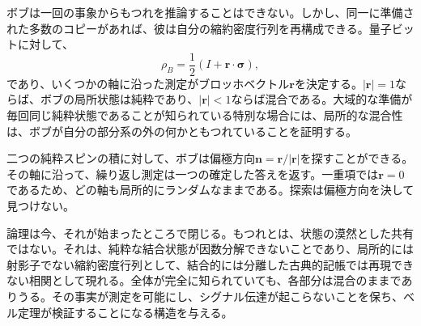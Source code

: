 ボブは一回の事象からもつれを推論することはできない。しかし、同一に準備された多数のコピーがあれば、彼は自分の縮約密度行列を再構成できる。量子ビットに対して、
\begin{equation}
\rho_B
=\frac12\left(
I+\mathbf r\cdot\boldsymbol{\sigma}
\right),
\label{eq:l7-bloch-density}
\end{equation}
であり、いくつかの軸に沿った測定がブロッホベクトル\(\mathbf r\)を決定する。\(|\mathbf r|=1\)ならば、ボブの局所状態は純粋であり、\(|\mathbf r|<1\)ならば混合である。大域的な準備が毎回同じ純粋状態であることが知られている特別な場合には、局所的な混合性は、ボブが自分の部分系の外の何かともつれていることを証明する。

二つの純粋スピンの積に対して、ボブは偏極方向\(\mathbf n=\mathbf r/|\mathbf r|\)を探すことができる。その軸に沿って、繰り返し測定は一つの確定した答えを返す。一重項では\(\mathbf r=0\)であるため、どの軸も局所的にランダムなままである。探索は偏極方向を決して見つけない。

\begin{classroomqa}
\end{classroomqa}

\begin{classroomqa}
\end{classroomqa}

論理は今、それが始まったところで閉じる。もつれとは、状態の漠然とした共有ではない。それは、純粋な結合状態が因数分解できないことであり、局所的には射影子でない縮約密度行列として、結合的には分離した古典的記帳では再現できない相関として現れる。全体が完全に知られていても、各部分は混合のままでありうる。その事実が測定を可能にし、シグナル伝達が起こらないことを保ち、ベル定理が検証することになる構造を与える。
